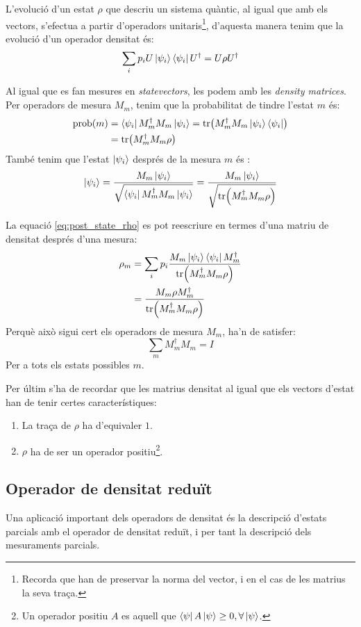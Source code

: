 L'evolució d'un estat $\rho$ que descriu un sistema quàntic, al igual que amb els vectors, s'efectua a partir d'operadors unitaris\footnote{Recorda que han de preservar la norma del vector, i en el cas de les matrius la seva traça.}, d'aquesta manera tenim que la evolució d'un operador densitat és:
$$
\sum_i p_i U \ket{\psi_i}\bra{\psi_i} U^\dagger = U\rho U^\dagger 
$$

Al igual que es fan mesures en \textit{statevectors}, les podem amb les \textit{density matrices}. Per operadors de mesura $M_m$, tenim que la probabilitat de tindre l'estat $m$ és:
\begin{align*}
	\mathrm{prob}(m) &= \bra{\psi_i}M_m^\dagger M_m\ket{\psi_i} = \tr(M_m^\dagger M_m \ket{\psi_i}\bra{\psi_i})\\ &= \tr(M_m^\dagger M_m \rho)
\end{align*}
També tenim que l'estat $\ket{\psi_i}$ després de la mesura $m$ és \cite{QCandQI:density_matrix}:
\begin{equation}
	\ket{\psi_i} = \frac{M_m\ket{\psi_i}}{\sqrt{\bra{\psi_i}M_m^\dagger M_m \ket{\psi_i}}} = \frac{M_m\ket{\psi_i}}{\sqrt{\tr(M_m^\dagger M_m \rho)}}
	\label{eq:post_state_rho}
\end{equation}

La equació \ref{eq:post_state_rho} es pot reescriure en termes d'una matriu de densitat després d'una mesura:
\begin{align*}
	\rho_m &= \sum_i p_i \frac{M_m\ket{\psi_i}\bra{\psi_i}M_m^\dagger}{\tr(M_m^\dagger M_m \rho)} \\
	&= \frac{M_m\rho M_m^\dagger }{\tr(M_m^\dagger M_m\rho)}
\end{align*}
Perquè això sigui cert els operadors de mesura $M_m$, ha'n de satisfer: 
$$
\sum_m M_m^\dagger M_m = I
$$
Per a tots els estats possibles $m$.

Per últim s'ha de recordar que les matrius densitat al igual que els vectors d'estat han de tenir certes característiques: 
\begin{enumerate}
	\item La traça de $\rho$ ha d'equivaler $1$.
	\item $\rho$ ha de ser un operador positiu\footnote{Un operador positiu $A$ es aquell que $\bra{\psi}A\ket{\psi}\geq0, \forall \ket{\psi}$.}.
\end{enumerate}
\subsection{Operador de densitat reduït}
Una aplicació important dels operadors de densitat és la descripció d'estats parcials amb el operador de densitat reduït, i per tant la descripció dels mesuraments parcials. 

